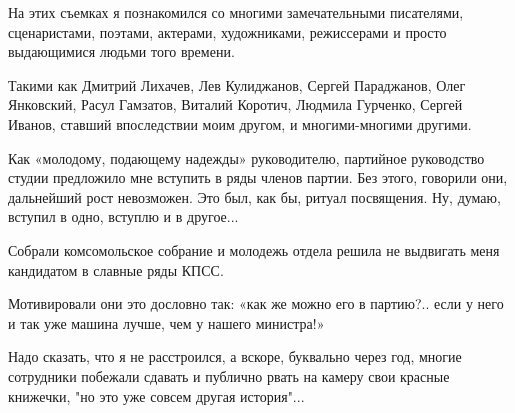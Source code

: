 На этих съемках я познакомился со многими замечательными писателями,
сценаристами, поэтами, актерами, художниками, режиссерами и просто выдающимися
людьми того времени.

Такими как Дмитрий Лихачев, Лев Кулиджанов, Сергей Параджанов, Олег Янковский,
Расул Гамзатов, Виталий Коротич, Людмила Гурченко, Сергей Иванов, ставший
впоследствии моим другом,  и многими-многими другими.

Как «молодому, подающему надежды» руководителю, партийное руководство студии
предложило мне вступить в ряды членов партии. Без этого, говорили они,
дальнейший рост невозможен. Это был, как бы, ритуал посвящения. Ну, думаю,
вступил в одно, вступлю и в другое...

Собрали комсомольское собрание и молодежь отдела решила не выдвигать меня
кандидатом в славные ряды КПСС.

Мотивировали они это дословно так: «как же можно его в партию?.. если у него и
так уже машина лучше, чем у нашего министра!»

Надо сказать, что я не расстроился, а вскоре, буквально через год, многие
сотрудники побежали сдавать и публично рвать на камеру свои красные книжечки,
"но это уже совсем другая история"...

